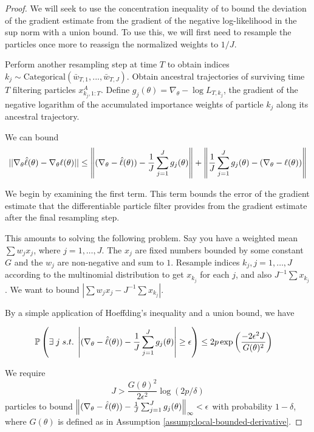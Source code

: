 \documentclass{article}
\begin{document}
\begin{proof}


We will seek to use the concentration inequality of \cite{delmoral2011ci} to bound the deviation of the gradient estimate from the gradient of the negative log-likelihood in the sup norm with a union bound. To use this, we will first need to resample the particles once more to reassign the normalized weights to $1/J$.

Perform another resampling step at time $T$ to obtain indices $k_j \sim \text{Categorical}(\bar{w}_{T,1}, ..., \bar{w}_{T,J})$. Obtain ancestral trajectories of surviving time $T$ filtering particles $x_{k_j, 1:T}^{A}$. Define $g_j(\theta) = \nabla_\theta -\log L_{T, k_j}$, the gradient of the negative logarithm of the accumulated importance weights of particle $k_j$ along its ancestral trajectory.

We can bound
\begin{align}
    ||\nabla_\theta \hat{\ell}(\theta) - \nabla_\theta \ell(\theta)|| 
    \leq 
    \left\lVert (\nabla_\theta - \hat{\ell}(\theta)) - \frac{1}{J}\sum_{j=1}^J g_j(\theta)\right\rVert 
    + \left\lVert\frac{1}{J}\sum_{j=1}^J g_j(\theta) - (\nabla_\theta -\ell(\theta))\right\rVert
\end{align}

We begin by examining the first term. This term bounds the error of the gradient estimate that the differentiable particle filter provides from the gradient estimate after the final resampling step. 

This amounts to solving the following problem. Say you have a weighted mean $\sum w_j x_j$, where $j=1,…,J$. The $x_j$ are fixed numbers bounded by some constant $G$ and the $w_j$ are non-negative and sum to $1$. Resample indices $k_j, j=1,…,J$ according to the multinomial distribution to get $x_{k_j}$ for each $j$, and also $J^{-1} \sum x_{k_j}$. We want to bound $|\sum w_j x_j - J^{-1} \sum x_{k_j}|$.

By a simple application of Hoeffding's inequality and a union bound, we have

\begin{align}
    \mathbb{P}\left(\exists \; j \;s.t.\; \left|(\nabla_\theta - \hat{\ell}(\theta)) - \frac{1}{J}\sum_{j=1}^J g_j(\theta)\right| \geq \epsilon \right)
    &\leq 2p\exp\left(\frac{-2\epsilon^2J}{G(\theta)^2}\right) 
\end{align}

We require \begin{equation}
    J > \frac{G(\theta)^2}{2\epsilon^2}\log(2p/\delta)
\end{equation} particles to bound $\left\lVert (\nabla_\theta - \hat{\ell}(\theta)) - \frac{1}{J}\sum_{j=1}^J g_j(\theta)\right\rVert_\infty < \epsilon$ with probability $1-\delta$, where $G(\theta)$ is defined as in Assumption \ref{assump:local-bounded-derivative}.


\end{proof}
\end{document}
